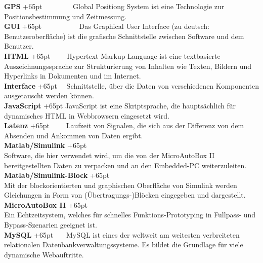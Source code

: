 \documentclass[fontsize = 12pt, paper = a4]{scrreprt}
\begin{document}
\textbf{GPS}
\hangindent+65pt  
\ \ \ \ \ \ \  \ Global Positiong System ist eine Technologie zur Positionsbestimmung und Zeitmessung.\\

\textbf{GUI}
\hangindent+65pt  
\ \ \ \ \ \ \ \ \ \   Das Graphical User Interface (zu deutsch: Benutzeroberfläche) ist die graf\-ische Schnittstelle zwischen Software und dem Benutzer.\\

\textbf{HTML}
\hangindent+65pt 
\ \ \ \ Hypertext Markup Language ist eine textbasierte Auszeichnungssprache zur Strukturierung von Inhalten wie Texten, Bildern und Hyperlinks in Dokumenten und im Internet.\\

\textbf{Interface}
\hangindent+65pt 
\ \ Schnittstelle, über die Daten von verschiedenen Komponenten ausgetauscht werden können.\\

\textbf{JavaScript}
\hangindent+65pt 
JavaScript ist eine Skriptsprache, die hauptsächlich für dynamisches HTML in Webbrowsern eingesetzt wird. \\

\textbf{Latenz}
\hangindent+65pt 
\ \ \ \ Laufzeit von Signalen, die sich aus der Differenz von dem Absenden und Ankommen von Daten ergibt.\\

\textbf{Matlab/Simulink}
\hangindent+65pt  \\
Software, die hier verwendet wird, um die von der MicroAutoBox II bereitgestellten Daten zu verpacken und an den Embedded-PC weiterzuleiten.\\

\textbf{Matlab/Simulink-Block}
\hangindent+65pt  \\
Mit der blockorientierten und graphischen Oberfläche von Simulink werden Gleichungen in Form von (Übertragungs-)Blöcken eingegeben und dargestellt.\\

\textbf{MicroAutoBox II}
\hangindent+65pt  \\
Ein Echtzeitsystem, welches für schnelles Funktions-Prototyping in Fullpass- und Bypass-Szenarien geeignet ist.\\


\textbf{MySQL}
\hangindent+65pt  
\ \ \  MySQL ist eines der weltweit am weitesten verbreiteten relationalen Datenbankverwaltungssysteme. Es bildet die Grundlage für viele dynamische Webauftritte.\\
\end{document}
